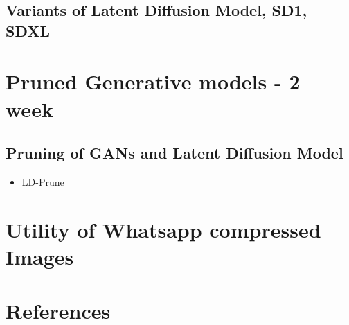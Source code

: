 \documentclass{article}
\begin{document}
    \subsection{Variants of Latent Diffusion Model, SD1, SDXL}

    \section{Pruned Generative models - 2 week}
    \subsection{Pruning of GANs and Latent Diffusion Model}
    \begin{itemize}
        \item LD-Prune
    \end{itemize}

    \section{Utility of Whatsapp compressed Images}

    \section{References}
\end{document}
